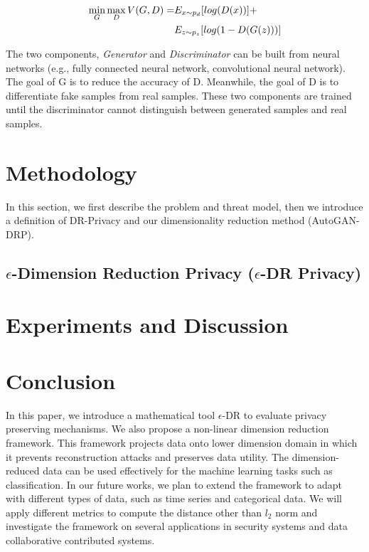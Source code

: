 \documentclass[final,5p,twocolumn]{elsarticle}
\begin{document}
	\begin{equation}
	\begin{split}
	\min_G \max_D{V(G,D)} = & E_{x \sim p_d} [log(D(x))] + \\& E_{z\sim p_z }[log( 1 - D( G(z) ))]
	\end{split}
	\end{equation}
	
	The two components, \textit{Generator} and \textit{Discriminator} can be built from neural networks (e.g., fully connected neural network, convolutional neural network). The goal of G is to reduce the accuracy of D. Meanwhile, the goal of D is to differentiate fake samples from real samples. These two components are trained until the discriminator cannot distinguish between generated samples and real samples.
	
	
	\section{Methodology} \label{methodology}
	
	In this section, we first describe the problem and threat model, then we introduce a definition of DR-Privacy and our dimensionality reduction method (AutoGAN-DRP).    
	
	
	\subsection{$\epsilon$-Dimension Reduction Privacy ($\epsilon$-DR Privacy)} \label{theory}
	
	
	
	
	\section{Experiments and Discussion}
	
	
	\section{Conclusion}
	In this paper, we introduce a mathematical tool $\epsilon$-DR to evaluate privacy preserving mechanisms. We also propose a non-linear dimension reduction framework. This framework projects data onto lower dimension domain in which it prevents reconstruction attacks and preserves data utility. The dimension-reduced data can be used effectively for the machine learning tasks such as classification. In our future works, we plan to extend the framework to adapt with different types of data, such as time series and categorical data. We will apply different metrics to compute the distance other than $l_2$ norm and investigate the framework on several applications in security systems and data collaborative contributed systems.  
	
\end{document}
